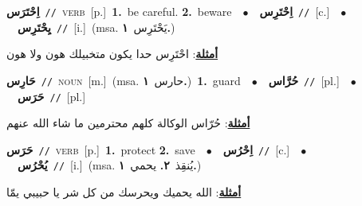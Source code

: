 \documentclass[10pt,a4paper,twoside]{article} %
\begin{document}
\begin{multicols}{2}
{\setlength\topsep{0pt}\textbf{\foreignlanguage{arabic}{اِحْتَرَس}}\ {\color{gray}\texttt{//}\color{black}}\ \textsc{verb}\ [p.]\ \textbf{1.}~be careful.  \textbf{2.}~beware\ \ $\bullet$\ \ \setlength\topsep{0pt}\textbf{\foreignlanguage{arabic}{اِحْتَرِس}}\ {\color{gray}\texttt{//}\color{black}}\ [c.]\ \ $\bullet$\ \ \setlength\topsep{0pt}\textbf{\foreignlanguage{arabic}{يِحْتَرِس}}\ {\color{gray}\texttt{//}\color{black}}\ [i.]\ \color{gray}(msa. \foreignlanguage{arabic}{يَحْتَرِس}~\foreignlanguage{arabic}{\textbf{١.}})\color{black}\  \begin{flushright}\color{gray}\foreignlanguage{arabic}{\textbf{\underline{\foreignlanguage{arabic}{أمثلة}}}: احْتَرِس حدا يكون متخبيلك هون ولا هون}\end{flushright}\color{black}} \vspace{2mm}

{\setlength\topsep{0pt}\textbf{\foreignlanguage{arabic}{حَارِس}}\ {\color{gray}\texttt{//}\color{black}}\ \textsc{noun}\ [m.]\ \color{gray}(msa. \foreignlanguage{arabic}{حارس}~\foreignlanguage{arabic}{\textbf{١.}})\color{black}\ \textbf{1.}~guard\ \ $\bullet$\ \ \setlength\topsep{0pt}\textbf{\foreignlanguage{arabic}{حُرَّاس}}\ {\color{gray}\texttt{//}\color{black}}\ [pl.]\ \ $\bullet$\ \ \setlength\topsep{0pt}\textbf{\foreignlanguage{arabic}{حَرَس}}\ {\color{gray}\texttt{//}\color{black}}\ [pl.]\  \begin{flushright}\color{gray}\foreignlanguage{arabic}{\textbf{\underline{\foreignlanguage{arabic}{أمثلة}}}: حُرّاس الوكالة كلهم محترمين ما شاء الله عنهم}\end{flushright}\color{black}} \vspace{2mm}

{\setlength\topsep{0pt}\textbf{\foreignlanguage{arabic}{حَرَس}}\ {\color{gray}\texttt{//}\color{black}}\ \textsc{verb}\ [p.]\ \textbf{1.}~protect  \textbf{2.}~save\ \ $\bullet$\ \ \setlength\topsep{0pt}\textbf{\foreignlanguage{arabic}{اِحْرُس}}\ {\color{gray}\texttt{//}\color{black}}\ [c.]\ \ $\bullet$\ \ \setlength\topsep{0pt}\textbf{\foreignlanguage{arabic}{يُحْرُس}}\ {\color{gray}\texttt{//}\color{black}}\ [i.]\ \color{gray}(msa. \foreignlanguage{arabic}{يُنقِذ}~\foreignlanguage{arabic}{\textbf{٢.}}  \foreignlanguage{arabic}{يحمي}~\foreignlanguage{arabic}{\textbf{١.}})\color{black}\  \begin{flushright}\color{gray}\foreignlanguage{arabic}{\textbf{\underline{\foreignlanguage{arabic}{أمثلة}}}: الله يحميك ويحرسك من كل شر يا حبيبي يمّا}\end{flushright}\color{black}} \vspace{2mm}


\end{multicols}
\end{document}
